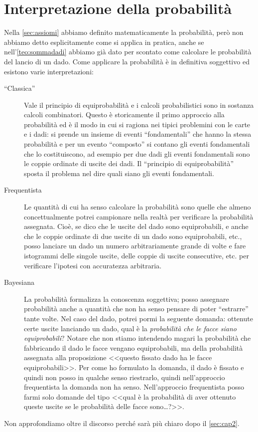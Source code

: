 
\section{Interpretazione della probabilità}

Nella \autoref{sec:assiomi} abbiamo definito matematicamente la probabilità,
però non abbiamo detto esplicitamente come si applica in pratica,
anche se nell'\autoref{teo:sommadadi} abbiamo già dato per scontato
come calcolare le probabilità del lancio di un dado.
Come applicare la probabilità è in definitiva soggettivo ed esistono varie interpretazioni:
\begin{description}
	\item[``Classica'']
		Vale il principio di equiprobabilità e i calcoli probabilistici sono in sostanza calcoli combinatori.
		Questo è storicamente il primo approccio alla probabilità ed è il modo in cui si ragiona
		nei tipici problemini con le carte e i dadi:
		si prende un insieme di eventi ``fondamentali'' che hanno la stessa probabilità
		e per un evento ``composto'' si contano gli eventi fondamentali che lo costituiscono,
		ad esempio per due dadi gli eventi fondamentali sono le coppie ordinate di uscite dei dadi.
		Il ``principio di equiprobabilità'' sposta il problema nel dire quali siano gli eventi fondamentali.
	\item[Frequentista]
		Le quantità di cui ha senso calcolare la probabilità sono quelle che almeno concettualmente potrei campionare nella realtà per verificare la probabilità assegnata.
		Cioè, se dico che le uscite del dado sono equiprobabili,
		e anche che le coppie ordinate di due uscite di un dado sono equiprobabili, etc.,
		posso lanciare un dado un numero arbitrariamente grande di volte
		e fare istogrammi delle singole uscite, delle coppie di uscite consecutive, etc.
		per verificare l'ipotesi con accuratezza arbitraria.
	\item[Bayesiana]
		La probabilità formalizza la conoscenza soggettiva;
		posso assegnare probabilità anche a quantità che non ha senso pensare di poter ``estrarre'' tante volte.
		Nel caso del dado, potrei pormi la seguente domanda:
		ottenute certe uscite lanciando un dado, qual è la \emph{probabilità che le facce siano equiprobabili}?
		Notare che non stiamo intendendo magari la probabilità che fabbricando il dado
		le facce vengano equiprobabili, ma della probabilità assegnata alla proposizione
		<<questo fissato dado ha le facce equiprobabili>>.
		Per come ho formulato la domanda,
		il dado è fissato e quindi non posso in qualche senso riestrarlo,
		quindi nell'approccio frequentista la domanda non ha senso.
		Nell'approccio frequentista posso farmi solo domande del tipo
		<<qual è la probabilità di aver ottenuto queste uscite se le probabilità delle facce sono\dots?>>.
\end{description}
Non approfondiamo oltre il discorso
perché sarà più chiaro dopo il \autoref{sec:cap2}.

